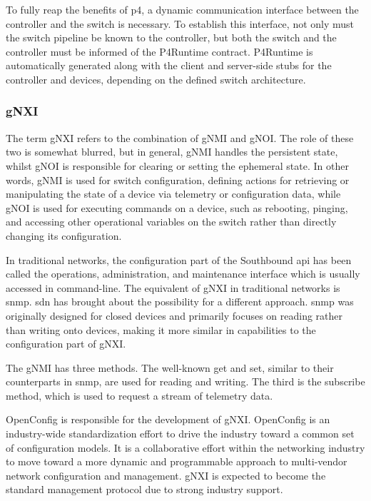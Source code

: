To fully reap the benefits of \gls{p4}, a dynamic communication interface between the controller and the switch is necessary\cite{peterson_software-defined_2021}. To establish this interface, not only must the switch pipeline be known to the controller, but both the switch and the controller must be informed of the P4Runtime contract. P4Runtime is automatically generated along with the client and server-side stubs for the controller and devices, depending on the defined switch architecture\cite{peterson_software-defined_2021}.

\subsubsection{gNXI}
The term gNXI refers to the combination of gNMI and gNOI. The role of these two is somewhat blurred, but in general, gNMI handles the persistent state, whilst gNOI is responsible for clearing or setting the ephemeral state. In other words, gNMI is used for switch configuration, defining actions for retrieving or manipulating the state of a device via telemetry or configuration data, while gNOI is used for executing commands on a device, such as rebooting, pinging, and accessing other operational variables on the switch rather than directly changing its configuration\cite{peterson_software-defined_2021}\cite{noauthor_openconfig_nodate}.

In traditional networks, the configuration part of the Southbound api has been called the operations, administration, and maintenance interface which is usually accessed in command-line\cite{peterson_software-defined_2021}. The equivalent of gNXI in traditional networks is \gls{snmp}. \gls{sdn} has brought about the possibility for a different approach. \gls{snmp} was originally designed for closed devices and primarily focuses on reading rather than writing onto devices, making it more similar in capabilities to the configuration part of gNXI\cite{peterson_software-defined_2021}.

The gNMI has three methods. The well-known get and set, similar to their counterparts in \gls{snmp}, are used for reading and writing. The third is the subscribe method, which is used to request a stream of telemetry data\cite{peterson_software-defined_2021}.

OpenConfig\cite{noauthor_openconfig_nodate} is responsible for the development of gNXI. OpenConfig is an industry-wide standardization effort to drive the industry toward a common set of configuration models. It is a collaborative effort within the networking industry to move toward a more dynamic and programmable approach to multi-vendor network configuration and management. gNXI is expected to become the standard management protocol due to strong industry support\cite{peterson_software-defined_2021}.

